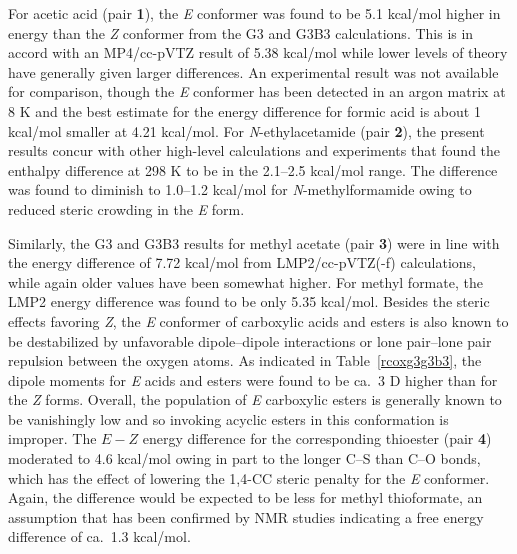 \documentclass[12pt]{report}
\def\tablab{Table}\def\tabslab{\tablab s}
\newcommand*\tbl[1]{\tablab~\ref{#1}}
\begin{document}
For acetic acid (pair \textbf{1}), the \textit{E} conformer was found to be 5.1 kcal/mol higher in energy than the \textit{Z} conformer from the G3 and G3B3 calculations. This is in accord with an MP4/cc-pVTZ result of 5.38 kcal/mol\cite{sen} while lower levels of theory have generally given larger differences.\cite{wibergez} An experimental result was not available for comparison, though the \textit{E} conformer has been detected in an argon matrix at 8 K\cite{mac} and the best estimate for the energy difference for formic acid is about 1 kcal/mol smaller at 4.21 kcal/mol.\cite{cs} For \textit{N}-ethylacetamide (pair \textbf{2}), the present results concur with other high-level calculations and experiments that found the enthalpy difference at 298 K to be in the 2.1--2.5 kcal/mol range.\cite{jez,murphy,vill,kang,mantz} The difference was found to diminish to 1.0--1.2 kcal/mol for \textit{N}-methylformamide owing to reduced steric crowding in the \textit{E} form.\cite{murphy,pawar}

Similarly, the G3 and G3B3 results for methyl acetate (pair \textbf{3}) were in line with the energy difference of 7.72 kcal/mol from LMP2/cc-pVTZ(-f) calculations,\cite{murphy} while again older values have been somewhat higher.\cite{wibergez,wibergez2,ev} For methyl formate, the LMP2 energy difference was found to be only 5.35 kcal/mol.\cite{zhong} Besides the steric effects favoring \textit{Z}, the \textit{E} conformer of carboxylic acids and esters is also known to be destabilized by unfavorable dipole--dipole interactions or lone pair--lone pair repulsion between the oxygen atoms.\cite{deer,sun} As indicated in \tbl{rcoxg3g3b3}, the dipole moments for \textit{E} acids and esters were found to be ca.\ 3 D higher than for the \textit{Z} forms. Overall, the population of \textit{E} carboxylic esters is generally known to be vanishingly low and so invoking acyclic esters in this conformation is improper.\cite{huis,dunitz} The $E - Z$ energy difference for the corresponding thioester (pair \textbf{4}) moderated to 4.6 kcal/mol owing in part to the longer C--S than C--O bonds, which has the effect of lowering the 1,4-CC steric penalty for the \textit{E} conformer. Again, the difference would be expected to be less for methyl thioformate, an assumption that has been confirmed by NMR studies indicating a free energy difference of ca.\ 1.3 kcal/mol.\cite{pawar}

\end{document}
